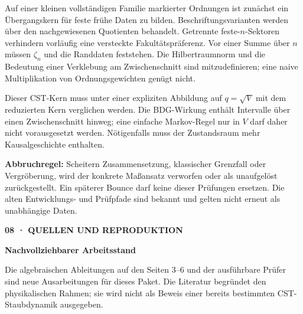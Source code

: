 \documentclass[11pt,a4paper]{article}
\newcommand{\kicker}[1]{{\sffamily\small\bfseries\color{teal}#1}\par}
\newcommand{\tit}[1]{{\sffamily\LARGE\bfseries\color{ink}#1}\par\vspace{6pt}}
\newcommand{\sect}[1]{\par\vspace{6pt}{\sffamily\large\bfseries\color{ink}#1}\par}
\newcommand{\note}[1]{\par\vspace{4pt}\colorbox{pale}{\parbox{\dimexpr\linewidth-2\fboxsep}{#1}}\par}
\begin{document}
\sect{Konkrete nächste Rechnung}
Auf einer kleinen vollständigen Familie markierter Ordnungen ist zunächst ein Übergangskern für feste frühe Daten zu bilden. Beschriftungsvarianten werden über den nachgewiesenen Quotienten behandelt. Getrennte feste-$n$-Sektoren verhindern vorläufig eine versteckte Fakultätspräferenz. Vor einer Summe über $n$ müssen $\zeta_n$ und die Randdaten feststehen. Die Hilbertraumnorm und die Bedeutung einer Verklebung am Zwischenschnitt sind mitzudefinieren; eine naive Multiplikation von Ordnungsgewichten genügt nicht.

Dieser CST-Kern muss unter einer expliziten Abbildung auf $q=\sqrt V$ mit dem reduzierten Kern verglichen werden. Die BDG-Wirkung enthält Intervalle über einen Zwischenschnitt hinweg; eine einfache Markov-Regel nur in $V$ darf daher nicht vorausgesetzt werden. Nötigenfalls muss der Zustandsraum mehr Kausalgeschichte enthalten.

\note{\textbf{Abbruchregel:} Scheitern Zusammensetzung, klassischer Grenzfall oder Vergröberung, wird der konkrete Maßansatz verworfen oder als unaufgelöst zurückgestellt. Ein späterer Bounce darf keine dieser Prüfungen ersetzen. Die alten Entwicklungs- und Prüfpfade sind bekannt und gelten nicht erneut als unabhängige Daten.}

\newpage
\kicker{08 · QUELLEN UND REPRODUKTION}
\tit{Nachvollziehbarer Arbeitsstand}
Die algebraischen Ableitungen auf den Seiten 3--6 und der ausführbare Prüfer sind neue Ausarbeitungen für dieses Paket. Die Literatur begründet den physikalischen Rahmen; sie wird nicht als Beweis einer bereits bestimmten CST-Staubdynamik ausgegeben.
\end{document}
